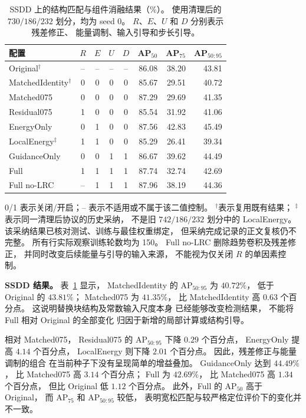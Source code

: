 \documentclass[journal]{IEEEtran}
\begin{document}
\begin{table}[!t]
\centering
\small
\setlength{\tabcolsep}{5pt}
\caption{SSDD 上的结构匹配与组件消融结果（\%）。
使用清理后的 $730/186/232$ 划分，均为 seed 0。
$R$、$E$、$U$ 和 $D$ 分别表示残差修正、
能量调制、输入引导和步长引导。}
\label{tab:ssdd_matched_components}
\begin{tabular*}{\textwidth}{@{\extracolsep{\fill}}lccccrrr}
\toprule
配置 & $R$ & $E$ & $U$ & $D$
& AP$_{50}$ & AP$_{75}$ & AP$_{50:95}$ \\
\midrule
Original$^{\dagger}$
& -- & -- & -- & --
& 86.08 & 38.20 & 43.81 \\
MatchedIdentity$^{\dagger}$
& 0 & 0 & 0 & 0
& 85.67 & 29.51 & 40.72 \\
Matched075
& 0 & 0 & 0 & 0
& 87.29 & 29.69 & 41.35 \\
\midrule
Residual075
& 1 & 0 & 0 & 0
& 85.54 & 31.92 & 41.06 \\
EnergyOnly
& 0 & 1 & 0 & 0
& 87.56 & 42.83 & 45.49 \\
LocalEnergy$^{\ddagger}$
& 1 & 1 & 0 & 0
& 85.29 & 26.41 & 39.34 \\
GuidanceOnly
& 0 & 0 & 1 & 1
& 86.67 & 39.62 & 44.49 \\
Full
& 1 & 1 & 1 & 1
& 87.74 & 32.74 & 42.69 \\
\midrule
Full no-LRC
& -- & 1 & 1 & 1
& 87.96 & 38.19 & 44.36 \\
\bottomrule
\end{tabular*}
\smallskip
\begin{minipage}{\linewidth}
\footnotesize
0/1 表示关闭/开启；-- 表示不适用或不属于该二值控制。
$^{\dagger}$表示复用既有结果；
$^{\ddagger}$表示同一清理后协议的历史采纳，
不是旧 $742/186/232$ 划分中的 LocalEnergy。
该采纳结果已核对测试、训练与最佳权重绑定，
但采纳完成记录的正文复核仍不完整。
所有行实际观察训练轮数均为 150。
Full no-LRC 删除趋势卷积及残差修正，
并同时改变后续能量与引导的输入来源，
不能视为仅关闭 $R$ 的单因素控制。
\end{minipage}
\end{table}

\textbf{SSDD 结果。}
表~\ref{tab:ssdd_matched_components} 显示，
MatchedIdentity 的 $\mathrm{AP}_{50:95}$ 为 $40.72\%$，
低于 Original 的 $43.81\%$；
Matched075 为 $41.35\%$，
比 MatchedIdentity 高 $0.63$ 个百分点。
这说明替换块结构及常数输入尺度本身
已经能够改变检测结果，
不能将 Full 相对 Original 的全部变化
归因于新增的局部计算或结构引导。

相对 Matched075，
Residual075 的 $\mathrm{AP}_{50:95}$
下降 $0.29$ 个百分点，
EnergyOnly 提高 $4.14$ 个百分点，
LocalEnergy 则下降 $2.01$ 个百分点。
因此，残差修正与能量调制的组合
在当前种子下没有呈现简单的增益叠加。
GuidanceOnly 达到 $44.49\%$，
比 Matched075 高 $3.14$ 个百分点；
Full 为 $42.69\%$，
比 Matched075 高 $1.34$ 个百分点，
但比 Original 低 $1.12$ 个百分点。
此外，Full 的 $\mathrm{AP}_{50}$ 高于 Original，
而 $\mathrm{AP}_{75}$ 和 $\mathrm{AP}_{50:95}$ 较低，
表明宽松匹配与较严格定位评价下的变化并不一致。
\end{document}
